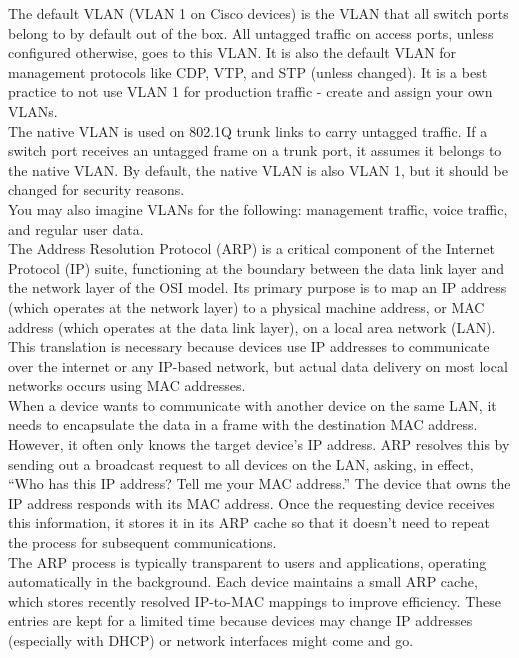 \documentclass[parindent=0pt]{article}
\begin{document}
The default VLAN (VLAN 1 on Cisco devices) is the VLAN that all switch ports belong to by default out of the box. All untagged traffic on access ports, unless configured otherwise, goes to this VLAN. It is also the default VLAN for management protocols like CDP, VTP, and STP (unless changed). It is a best practice to not use VLAN 1 for production traffic - create and assign your own VLANs.\\

The native VLAN is used on 802.1Q trunk links to carry untagged traffic. If a switch port receives an untagged frame on a trunk port, it assumes it belongs to the native VLAN. By default, the native VLAN is also VLAN 1, but it should be changed for security reasons.\\

You may also imagine VLANs for the following: management traffic, voice traffic, and regular user data.\\

The Address Resolution Protocol (ARP) is a critical component of the Internet Protocol (IP) suite, functioning at the boundary between the data link layer and the network layer of the OSI model. Its primary purpose is to map an IP address (which operates at the network layer) to a physical machine address, or MAC address (which operates at the data link layer), on a local area network (LAN). This translation is necessary because devices use IP addresses to communicate over the internet or any IP-based network, but actual data delivery on most local networks occurs using MAC addresses.\\

When a device wants to communicate with another device on the same LAN, it needs to encapsulate the data in a frame with the destination MAC address. However, it often only knows the target device’s IP address. ARP resolves this by sending out a broadcast request to all devices on the LAN, asking, in effect, “Who has this IP address? Tell me your MAC address.” The device that owns the IP address responds with its MAC address. Once the requesting device receives this information, it stores it in its ARP cache so that it doesn't need to repeat the process for subsequent communications.\\

The ARP process is typically transparent to users and applications, operating automatically in the background. Each device maintains a small ARP cache, which stores recently resolved IP-to-MAC mappings to improve efficiency. These entries are kept for a limited time because devices may change IP addresses (especially with DHCP) or network interfaces might come and go.\\
\end{document}
